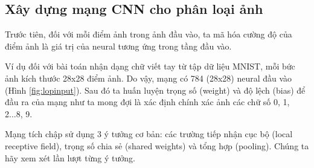 \subsection{Xây dựng mạng CNN cho phân loại ảnh}
Trước tiên, đối với mỗi điểm ảnh trong ảnh đầu vào, ta mã hóa cường độ của 
điểm ảnh là giá trị của neural tương ứng trong tầng đầu vào.
 
Ví dụ đối với bài toán nhận dạng chữ viết tay từ tập dữ liệu MNIST, mỗi bức 
ảnh kích thước 28x28 điểm ảnh. Do vậy, mạng có 784 (28x28) neural đầu vào (Hình 
\ref{fig:lopinput}). Sau đó ta huấn luyện trọng số (weight) và độ lệch (bias) để đầu ra của mạng 
như ta mong đợi là xác định chính xác ảnh các chữ số 0, 1, 2...8, 9.

Mạng tích chập sử dụng 3 ý tưởng cơ bản: các trường tiếp nhận cục bộ (local 
receptive field), trọng số chia sẻ (shared weights) và tổng hợp (pooling). Chúng ta 
hãy xem xét lần lượt từng ý tưởng.

